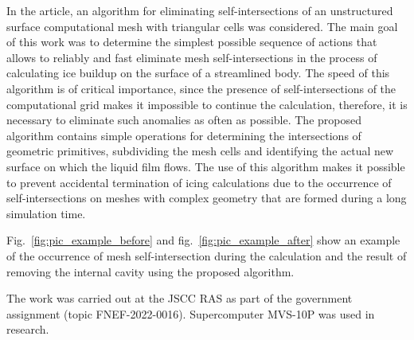 \documentclass[
11pt,%
tightenlines,%
twoside,%
onecolumn,%
nofloats,%
nobibnotes,%
nofootinbib,%
superscriptaddress,%
noshowpacs,%
centertags]%
{revtex4}
\begin{document}
In the article, an algorithm for eliminating self-intersections of an unstructured surface computational mesh with triangular cells was considered.
The main goal of this work was to determine the simplest possible sequence of actions that allows to reliably and fast eliminate mesh self-intersections in the process of calculating ice buildup on the surface of a streamlined body.
The speed of this algorithm is of critical importance, since the presence of self-intersections of the computational grid makes it impossible to continue the calculation, therefore, it is necessary to eliminate such anomalies as often as possible.
The proposed algorithm contains simple operations for determining the intersections of geometric primitives, subdividing the mesh cells and identifying the actual new surface on which the liquid film flows.
The use of this algorithm makes it possible to prevent accidental termination of icing calculations due to the occurrence of self-intersections on meshes with complex geometry that are formed during a long simulation time.

Fig.~\ref{fig:pic_example_before} and fig.~\ref{fig:pic_example_after} show an example of the occurrence of mesh self-intersection during the calculation and the result of removing the internal cavity using the proposed algorithm.

\begin{acknowledgments}
The work was carried out at the JSCC RAS as part of the government assignment (topic FNEF-2022-0016). Supercomputer MVS-10P was used in research.
\end{acknowledgments}
\end{document}
